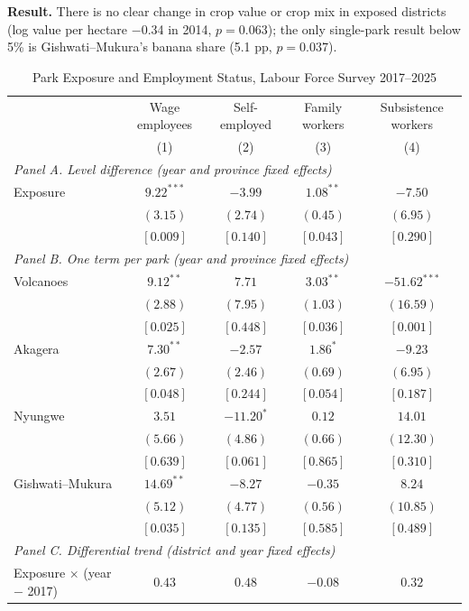 \documentclass[11pt]{article}
\begin{document}
\textbf{Result.} There is no clear change in crop value or crop mix in exposed districts (log value per hectare $-$0.34 in 2014, $p=0.063$); the only single-park result below 5\% is Gishwati--Mukura's banana share (5.1 pp, $p=0.037$).
\clearpage
\begin{table}[H]
\centering\small\setlength{\tabcolsep}{4pt}
\caption{Park Exposure and Employment Status, Labour Force Survey 2017--2025}
\label{tab:lfs}
\begin{tabular}{lcccc}
\toprule
 & Wage employees & Self-employed & Family workers & Subsistence workers \\
 & (1) & (2) & (3) & (4) \\
\midrule
\multicolumn{5}{l}{\textit{Panel A. Level difference (year and province fixed effects)}} \\
Exposure & $9.22^{***}$ & $-3.99$ & $1.08^{**}$ & $-7.50$ \\
 & $(3.15)$ & $(2.74)$ & $(0.45)$ & $(6.95)$ \\
 & $[0.009]$ & $[0.140]$ & $[0.043]$ & $[0.290]$ \\
\multicolumn{5}{l}{\textit{Panel B. One term per park (year and province fixed effects)}} \\
Volcanoes & $9.12^{**}$ & $7.71$ & $3.03^{**}$ & $-51.62^{***}$ \\
 & $(2.88)$ & $(7.95)$ & $(1.03)$ & $(16.59)$ \\
 & $[0.025]$ & $[0.448]$ & $[0.036]$ & $[0.001]$ \\
Akagera & $7.30^{**}$ & $-2.57$ & $1.86^{*}$ & $-9.23$ \\
 & $(2.67)$ & $(2.46)$ & $(0.69)$ & $(6.95)$ \\
 & $[0.048]$ & $[0.244]$ & $[0.054]$ & $[0.187]$ \\
Nyungwe & $3.51$ & $-11.20^{*}$ & $0.12$ & $14.01$ \\
 & $(5.66)$ & $(4.86)$ & $(0.66)$ & $(12.30)$ \\
 & $[0.639]$ & $[0.061]$ & $[0.865]$ & $[0.310]$ \\
Gishwati--Mukura & $14.69^{**}$ & $-8.27$ & $-0.35$ & $8.24$ \\
 & $(5.12)$ & $(4.77)$ & $(0.56)$ & $(10.85)$ \\
 & $[0.035]$ & $[0.135]$ & $[0.585]$ & $[0.489]$ \\
\multicolumn{5}{l}{\textit{Panel C. Differential trend (district and year fixed effects)}} \\
Exposure $\times$ (year $-$ 2017) & $0.43$ & $0.48$ & $-0.08$ & $0.32$ \\

\end{tabular}
\end{table}
\end{document}
